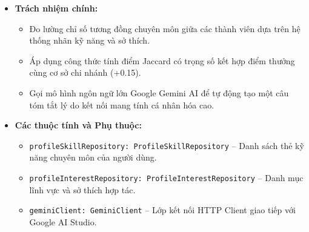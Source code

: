 \begin{itemize}
    \item \textbf{Trách nhiệm chính:}
    \begin{itemize}
        \item Đo lường chỉ số tương đồng chuyên môn giữa các thành viên dựa trên hệ thống nhãn kỹ năng và sở thích.
        \item Áp dụng công thức tính điểm Jaccard có trọng số kết hợp điểm thưởng cùng cơ sở chi nhánh (+0.15).
        \item Gọi mô hình ngôn ngữ lớn Google Gemini AI để tự động tạo một câu tóm tắt lý do kết nối mang tính cá nhân hóa cao.
    \end{itemize}
    \item \textbf{Các thuộc tính và Phụ thuộc:}
    \begin{itemize}
        \item \texttt{profileSkillRepository: ProfileSkillRepository} -- Danh sách thẻ kỹ năng chuyên môn của người dùng.
        \item \texttt{profileInterestRepository: ProfileInterestRepository} -- Danh mục lĩnh vực và sở thích hợp tác.
        \item \texttt{geminiClient: GeminiClient} -- Lớp kết nối HTTP Client giao tiếp với Google AI Studio.
    \end{itemize}
\end{itemize}

